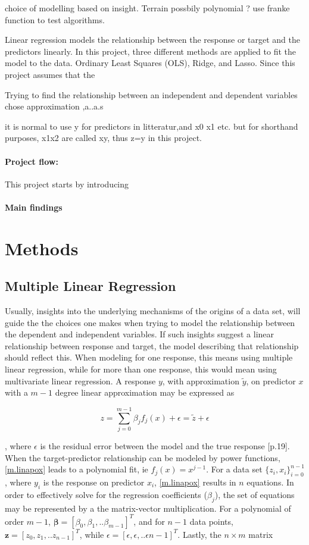 \documentclass[%
oneside,                 %
final,                   %
10pt]{article}
\begin{document}
choice of modelling based on insight. Terrain possbily polynomial ? use franke function to test algorithms. 

Linear regression models the relationship between the response or target and the predictors linearly. In this project, three different methods are applied to fit the model to the data. Ordinary Least Squares (OLS), Ridge, and Lasso. Since this project assumes that the 

 Trying to find the relationship between an independent and dependent variables chose approximation ,a..a.s

it is normal to use y for predictors in litteratur,and x0 x1 etc. but for shorthand purposes, x1x2 are called xy, thus z=y in this project.
\paragraph{Project flow:} This project starts by introducing 
\paragraph{Main findings}


\section{Methods}
\subsection{Multiple Linear Regression}
Usually, insights into the underlying mechanisms of the origins of a data set, will guide the the choices one makes when trying to model the relationship between the dependent and independent variables. If such insights suggest a linear relationship between response and target, the model describing that relationship should reflect this. When modeling for one response, this means using multiple linear regression, while for more than one response, this would mean using multivariate linear regression. A response $y$, with approximation $\tilde{y}$, on predictor $x$ with a $m-1$ degree linear approximation may be expressed as

\begin{equation}
\displaystyle z=\sum_{j=0}^{m-1} \beta_j f_j(x)+\epsilon = \tilde{z}+\epsilon  
\label{m.linapox}
\end{equation}

, where $\epsilon$ is the residual error between the model and the true response \cite{MurphyKevin}[p.19]. When the target-predictor relationship can be modeled by power functions, \eqref{m.linapox} leads to a polynomial fit, ie $f_j(x)=x^{j-1}$. For a data set $\{z_i,x_i\} _{i=0}^{n-1}$, where $y_i$ is the response on predictor $x_i$, \eqref{m.linapox} results in $n$ equations. In order to effectively solve for the regression coefficients ($\beta_j$), the set of equations may be represented by a the matrix-vector multiplication. For a polynomial of order $m-1$, $\bm{\beta}=[\beta_0,\beta_1,..\beta_{m-1}]^T$, and for $n-1$ data points,  $\bm{z}=[z_0,z_1,..z_{n-1}]^T$, while $ \epsilon= [\epsilon,\epsilon,..\epsilon{n-1}]^T$. Lastly, the $n \times m $ matrix
\end{document}
